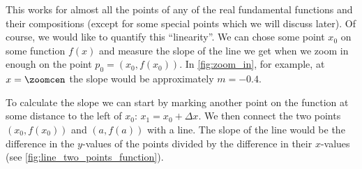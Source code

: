 This works for almost all the points of any of the real fundamental functions and their compositions (except for some special points which we will discuss later). Of course, we would like to quantify this ``linearity''. We can chose some point $x_{0}$ on some function $f(x)$ and measure the slope of the line we get when we zoom in enough on the point $p_{0}=\left(x_{0},f\left(x_{0}\right)\right)$. In \autoref{fig:zoom_in}, for example, at $x=\zoomcen$ the slope would be approximately $m=-0.4$.

To calculate the slope we can start by marking another point on the function at some distance to the left of $x_{0}$: $x_{1}=x_{0}+\Delta x$. We then connect the two points $\left(x_{0},f\left(x_{0}\right)\right)$ and $\left(a,f(a)\right)$ with a line. The slope of the line would be the difference in the $y$-values of the points divided by the difference in their $x$-values (see \autoref{fig:line_two_points_function}).

\begin{figure}
  \centering
  \caption{}
  \label{fig:line_two_points_function}
\end{figure}

